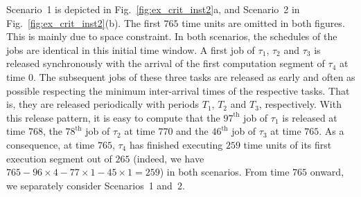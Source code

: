 Scenario~1 is depicted in Fig.~\ref{fig:ex_crit_inst2}a, and Scenario~2 in Fig.~\ref{fig:ex_crit_inst2}(b). The first $765$ time units are omitted in both figures. This is mainly due to space constraint. In both scenarios, the schedules of the jobs are identical in this initial time window.  
A first job of $\tau_1$, $\tau_2$ and $\tau_3$ is released synchronously with the arrival of the first computation segment of $\tau_4$ at time $0$. The subsequent jobs of these three tasks are released as early and often as possible respecting the minimum inter-arrival times of the respective tasks. That is, they are released periodically with periods $T_1$, $T_2$ and $T_3$, respectively. With this release pattern, it is easy to compute that the $97^\text{th}$ job of $\tau_1$ is released at time $768$, the $78^\text{th}$ job of $\tau_2$ at time $770$ and the $46^\text{th}$ job of $\tau_3$ at time $765$. As a consequence, at time $765$, $\tau_4$ has finished executing $259$ time units of its first execution segment out of $265$ (indeed, we have $765 - 96 \times 4 - 77 \times 1 - 45 \times 1 = 259$) in both scenarios. From time $765$ onward, we separately consider Scenarios~1 and~2.

